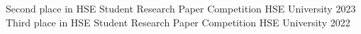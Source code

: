 
\begin{cvhonors}

  \cvhonor
    {Second place in HSE Student Research Paper Competition} %
    {HSE University} %
    {} %
    {2023} %
  \cvhonor
    {Third place in HSE Student Research Paper Competition} %
    {HSE University} %
    {} %
    {2022} %

\end{cvhonors}